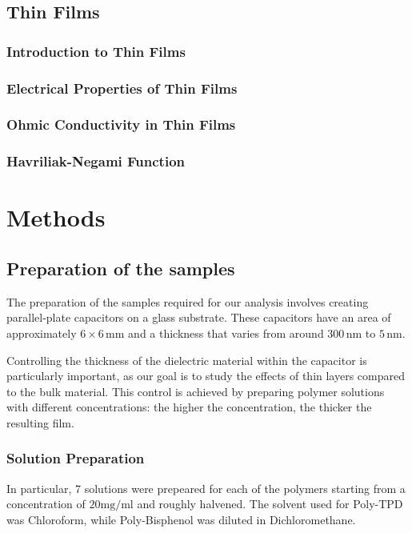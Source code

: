 \section{Thin Films}
\subsection{Introduction to Thin Films}
\subsection{Electrical Properties of Thin Films}
\subsection{Ohmic Conductivity in Thin Films}
\subsection{Havriliak-Negami Function}

\chapter{Methods}

\section{Preparation of the samples}

The preparation of the samples required for our analysis involves creating parallel-plate capacitors on a glass substrate. These capacitors have an area of approximately \( 6 \times 6 \, \text{mm} \) and a thickness that varies from around \( 300 \, \text{nm} \) to \( 5 \, \text{nm} \).

Controlling the thickness of the dielectric material %
within the capacitor is particularly important, as our goal is to study the effects of thin layers compared to the bulk material. This control is achieved by preparing polymer solutions with different concentrations: the higher the concentration, the thicker the resulting film.
\subsection{Solution Preparation}

In particular, 7 solutions were prepeared for each of the polymers starting from a concentration of $20 \text{mg/ml}$ %
and roughly halvened.
The solvent used for Poly-TPD was Chloroform, while Poly-Bisphenol was diluted in Dichloromethane.

